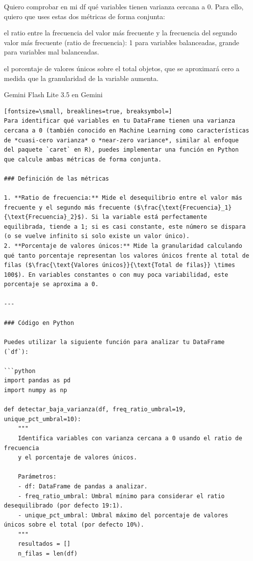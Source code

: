 \documentclass[12pt,a4paper,oneside]{book}
\begin{document}
\begin{iaprompt}
Quiero comprobar en mi df qué variables tienen varianza cercana a 0. Para ello, quiero que uses estas dos métricas de forma conjunta:

el ratio entre la frecuencia del valor más frecuente y la frecuencia del segundo valor más frecuente (ratio de frecuencia): 1 para variables balanceadas, grande para variables mal balanceadas.

el porcentaje de valores únicos sobre el total objetos, que se aproximará cero a medida que la granularidad de la variable aumenta.
\end{iaprompt}
\begin{iaresp}{Gemini Flash Lite 3.5 en Gemini}
\begin{Verbatim}[fontsize=\small, breaklines=true, breaksymbol=]
Para identificar qué variables en tu DataFrame tienen una varianza cercana a 0 (también conocido en Machine Learning como características de *cuasi-cero varianza* o *near-zero variance*, similar al enfoque del paquete `caret` en R), puedes implementar una función en Python que calcule ambas métricas de forma conjunta.

### Definición de las métricas

1. **Ratio de frecuencia:** Mide el desequilibrio entre el valor más frecuente y el segundo más frecuente ($\frac{\text{Frecuencia}_1}{\text{Frecuencia}_2}$). Si la variable está perfectamente equilibrada, tiende a 1; si es casi constante, este número se dispara (o se vuelve infinito si solo existe un valor único).
2. **Porcentaje de valores únicos:** Mide la granularidad calculando qué tanto porcentaje representan los valores únicos frente al total de filas ($\frac{\text{Valores únicos}}{\text{Total de filas}} \times 100$). En variables constantes o con muy poca variabilidad, este porcentaje se aproxima a 0.

---

### Código en Python

Puedes utilizar la siguiente función para analizar tu DataFrame (`df`):

```python
import pandas as pd
import numpy as np

def detectar_baja_varianza(df, freq_ratio_umbral=19, unique_pct_umbral=10):
    """
    Identifica variables con varianza cercana a 0 usando el ratio de frecuencia 
    y el porcentaje de valores únicos.
    
    Parámetros:
    - df: DataFrame de pandas a analizar.
    - freq_ratio_umbral: Umbral mínimo para considerar el ratio desequilibrado (por defecto 19:1).
    - unique_pct_umbral: Umbral máximo del porcentaje de valores únicos sobre el total (por defecto 10%).
    """
    resultados = []
    n_filas = len(df)
    

\end{Verbatim}
\end{iaresp}
\end{document}

